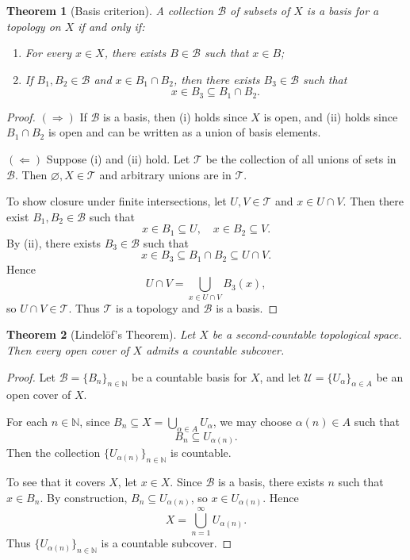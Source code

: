 \documentclass[12pt]{article}
\newtheorem{theorem}{Theorem}
\begin{document}
\begin{theorem}[Basis criterion]
A collection $\mathcal{B}$ of subsets of $X$ is a basis for a topology on $X$ if and only if:
\begin{enumerate}[label=(\roman*)]
\item For every $x\in X$, there exists $B\in\mathcal{B}$ such that $x\in B$;
\item If $B_1,B_2\in\mathcal{B}$ and $x\in B_1\cap B_2$, then there exists $B_3\in\mathcal{B}$ such that
\[
x\in B_3 \subseteq B_1\cap B_2.
\]
\end{enumerate}
\end{theorem}

\begin{proof}
$(\Rightarrow)$ If $\mathcal{B}$ is a basis, then (i) holds since $X$ is open, and (ii) holds since $B_1\cap B_2$ is open and can be written as a union of basis elements.

$(\Leftarrow)$ Suppose (i) and (ii) hold. Let $\mathcal{T}$ be the collection of all unions of sets in $\mathcal{B}$. Then $\varnothing, X \in \mathcal{T}$ and arbitrary unions are in $\mathcal{T}$.

To show closure under finite intersections, let $U,V\in\mathcal{T}$ and $x\in U\cap V$. Then there exist $B_1,B_2\in\mathcal{B}$ such that
\[
x\in B_1\subseteq U, \quad x\in B_2\subseteq V.
\]
By (ii), there exists $B_3\in\mathcal{B}$ such that
\[
x\in B_3 \subseteq B_1\cap B_2 \subseteq U\cap V.
\]
Hence
\[
U\cap V = \bigcup_{x\in U\cap V} B_3(x),
\]
so $U\cap V\in\mathcal{T}$. Thus $\mathcal{T}$ is a topology and $\mathcal{B}$ is a basis.
\end{proof}

\begin{theorem}[Lindelöf's Theorem]
Let $X$ be a second-countable topological space. Then every open cover of $X$ admits a countable subcover.
\end{theorem}

\begin{proof}
Let $\mathcal{B} = \{B_n\}_{n\in\mathbb{N}}$ be a countable basis for $X$, and let $\mathcal{U} = \{U_\alpha\}_{\alpha\in A}$ be an open cover of $X$.

For each $n\in\mathbb{N}$, since $B_n \subseteq X = \bigcup_{\alpha\in A} U_\alpha$, we may choose $\alpha(n)\in A$ such that
\[
B_n \subseteq U_{\alpha(n)}.
\]
Then the collection $\{U_{\alpha(n)}\}_{n\in\mathbb{N}}$ is countable.

To see that it covers $X$, let $x\in X$. Since $\mathcal{B}$ is a basis, there exists $n$ such that $x\in B_n$. By construction, $B_n \subseteq U_{\alpha(n)}$, so $x\in U_{\alpha(n)}$. Hence
\[
X = \bigcup_{n=1}^\infty U_{\alpha(n)}.
\]
Thus $\{U_{\alpha(n)}\}_{n\in\mathbb{N}}$ is a countable subcover.
\end{proof}
\end{document}
